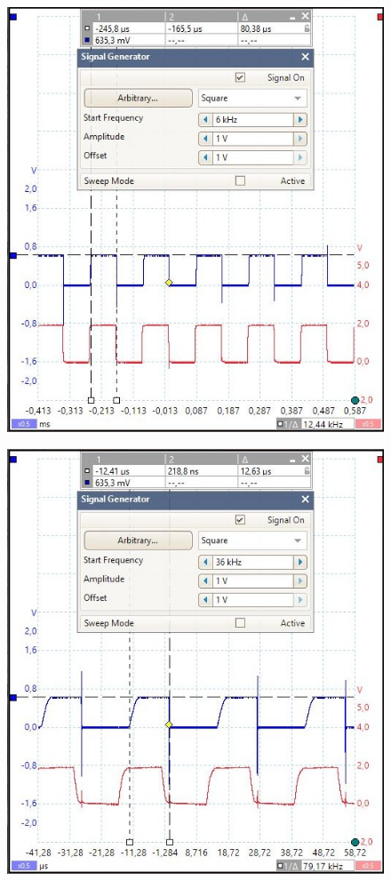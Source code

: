 \begin{figure}[H]
	\centering
	\begin{minipage}{.399\linewidth}
		\centering
		\includegraphics[width=\textwidth]{figures/results/power_led_driver/6khz_crop.JPG}
		\label{fig:pwr_led_6k}
	\end{minipage}%
	\hspace{.1\linewidth}
	\begin{minipage}{.399\linewidth}
		\centering
		\includegraphics[width=\textwidth]{figures/results/power_led_driver/36khz_crop.JPG}

\end{minipage}
\end{figure}
